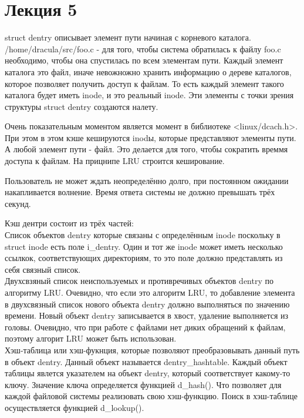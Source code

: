 \chapter{Лекция 5}
struct dentry описывает элемент пути начиная с корневого каталога.\\

/home/dracula/src/foo.c - для того, чтобы система обратилась к файлу foo.c необходимо, чтобы она спустилась по всем элементам пути. Каждый элемент каталога это файл, иначе невожножно хранить информацию о дереве каталогов, которое позволяет получить доступ к файлам. То есть каждый элемент такого каталога будет иметь inode, и это реальный inode. Эти элементы с точки зрения структуры struct dentry создаются налету. 

Очень показательным моментом является момент в библиотеке <linux/dcach.h>. При этом в этом кэше кешируются inodы, которые представляют элементы пути. А любой элемент пути - файл. Это делается для того, чтобы сократить времмя доступа к файлам. На прицнипе LRU строится кеширование.

Пользователь не может ждать неопределённо долго, при постоянном ожидании накапливается волнение. Время ответа системы не должно превышать трёх секунд. 

Кэш дентри состоит из трёх частей:\\
Список объектов dentry которые связаны с определённым inode поскольку в struct inode есть поле i\_dentry. Один и тот же inode может иметь несколько ссылкок, соответствующих директориям, то это поле должно представлять из себя связный список. \\
Двухсвзяный список неиспользуемых и противречивых объектов dentry по алгоритму LRU. Очевидно, что если это алгоритм LRU, то добавление элемента в двухсвязный список нового объекта dentry должно выполняться по значению времени. Новый объект dentry записывается в хвост, удаление выполняется из головы. Очевидно, что при работе с файлами нет диких обращений к файлам, поэтому алгорит LRU может быть использован.\\
Хэш-таблица или хэш-фукнция, которые позволяют преобразовывать данный путь в объект dentry. Данный объект называется dentry\_hashtable. Каждый объект таблицы явлется указателем на объект dentry, который соответствует какому-то ключу. Значение ключа определяется функцией d\_hash(). Что позволяет для каждой файловой системы реализовать свою хэш-функцию. Поиск в хэш-таблице осуществляется функцией d\_lookup().\\

